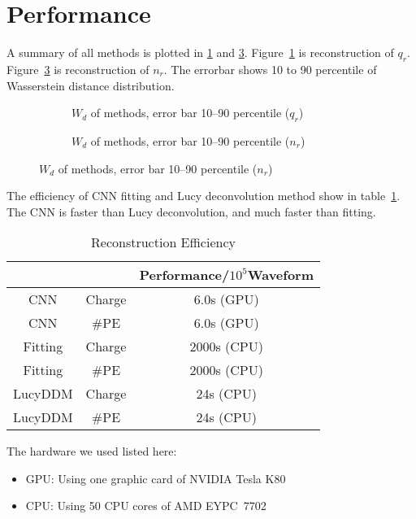 \section{Performance} %
A summary of all methods is plotted in \ref{fig:chargesummary} and \ref{fig:penumsummary}. Figure~\ref{fig:chargesummary} is reconstruction of $q_{r}$. Figure~\ref{fig:penumsummary} is reconstruction of $n_{r}$. The errorbar shows 10 to 90 percentile of Wasserstein distance distribution. 
\begin{figure}[H]
\begin{minipage}[b]{.5\textwidth}
\begin{figure}[H]
    \centering
    \resizebox{\textwidth}{!}{}
    \caption{\label{fig:chargesummary} $W_{d}$ of methods, error bar 10--90 percentile ($q_{r}$)}
\end{figure}
\end{minipage}
\begin{minipage}[b]{.5\textwidth}
\begin{figure}[H]
    \centering
    \resizebox{\textwidth}{!}{}
    \caption{\label{fig:penumsummary} $W_{d}$ of methods, error bar 10--90 percentile ($n_{r}$)}
\end{figure}
\end{minipage}
\end{figure}

The efficiency of CNN fitting and Lucy deconvolution method show in table~\ref{fig:efficiency}. The CNN is faster than Lucy deconvolution, and much faster than fitting. 

\begin{table}[H]
    \centering
    \caption{\label{fig:efficiency} Reconstruction Efficiency}
    \begin{tabular}{c|c|c}
        \hline
        & & Performance/$10^{5}$Waveform \\
        \hline
        CNN & Charge & 6.0s (GPU) \\
        \hline
        CNN & \#PE & 6.0s (GPU)\\
        \hline
        Fitting & Charge & 2000s (CPU) \\
        \hline
        Fitting & \#PE & 2000s (CPU) \\
        \hline
        LucyDDM & Charge & 24s (CPU) \\
        \hline
        LucyDDM & \#PE & 24s (CPU) \\
        \hline
    \end{tabular}
\end{table}
\hspace{4mm}

The hardware we used listed here: 
\begin{center}
\begin{itemize}
    \item GPU: Using one graphic card of NVIDIA\textsuperscript{\textregistered} Tesla\textsuperscript{\textregistered} K80
    \item CPU: Using 50 CPU cores of AMD EYPC\texttrademark\ 7702
\end{itemize}
\end{center}

